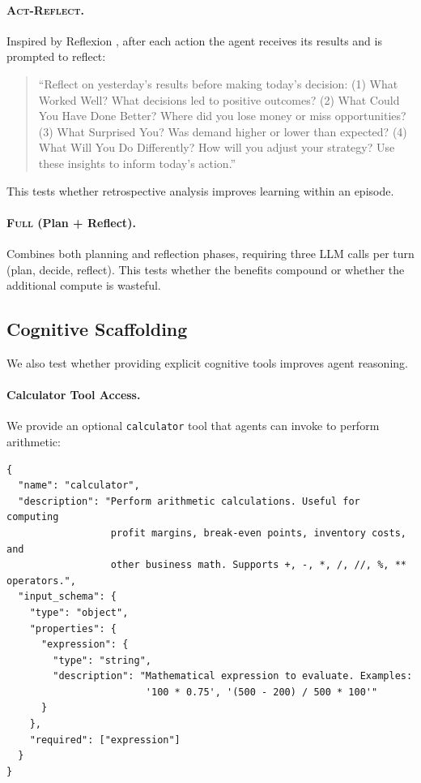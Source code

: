 \paragraph{\textsc{Act-Reflect}.}
Inspired by Reflexion \citep{shinn2023reflexion}, after each action the agent receives its results and is prompted to reflect:
\begin{quote}
\small\ttfamily
``Reflect on yesterday's results before making today's decision: (1) What Worked Well? What decisions led to positive outcomes? (2) What Could You Have Done Better? Where did you lose money or miss opportunities? (3) What Surprised You? Was demand higher or lower than expected? (4) What Will You Do Differently? How will you adjust your strategy? Use these insights to inform today's action.''
\end{quote}
This tests whether retrospective analysis improves learning within an episode.

\paragraph{\textsc{Full} (Plan + Reflect).}
Combines both planning and reflection phases, requiring three LLM calls per turn (plan, decide, reflect). This tests whether the benefits compound or whether the additional compute is wasteful.

\subsection{Cognitive Scaffolding}
\label{sec:scaffolding}

We also test whether providing explicit cognitive tools improves agent reasoning.

\paragraph{Calculator Tool Access.}
We provide an optional \texttt{calculator} tool that agents can invoke to perform arithmetic:
\begin{verbatim}
{
  "name": "calculator",
  "description": "Perform arithmetic calculations. Useful for computing 
                  profit margins, break-even points, inventory costs, and 
                  other business math. Supports +, -, *, /, //, %, ** operators.",
  "input_schema": {
    "type": "object",
    "properties": {
      "expression": {
        "type": "string", 
        "description": "Mathematical expression to evaluate. Examples: 
                        '100 * 0.75', '(500 - 200) / 500 * 100'"
      }
    },
    "required": ["expression"]
  }
}
\end{verbatim}

